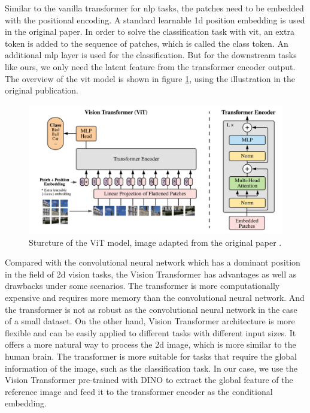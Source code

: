 \documentclass[12pt,DIV14,BCOR12mm,a4paper,footinclude=false,headinclude,parskip=half-,twoside,openright,cleardoublepage=empty,toc=index,bibliography=totoc,listof=totoc]{scrreprt}
\numberwithin{equation}{chapter}
\begin{document}
Similar to the vanilla transformer for \gls{nlp} tasks, the patches need to be embedded with the positional encoding. A standard learnable \gls{1d} position embedding is used in the original paper. In order to solve the classification task with \gls{vit}, an extra token is added to the sequence of patches, which is called the class token. An additional \gls{mlp} layer is used for the classification. But for the downstream tasks like ours, we only need the latent feature from the transformer encoder output. The overview of the \gls{vit} model is shown in figure \ref{img:vit}, using the illustration in the original publication.
\begin{figure}[h]
	\centering
	\includegraphics[width=1.0\textwidth]{img/vit.png}
	\caption{Sturcture of the ViT model, image adapted from the original paper \cite{dosovitskiy2021image}.}
	\label{img:vit}
\end{figure}

Compared with the convolutional neural network which has a dominant position in the field of \gls{2d} vision tasks, the Vision Transformer has advantages as well as drawbacks under some scenarios. The transformer is more computationally expensive and requires more memory than the convolutional neural network. And the transformer is not as robust as the convolutional neural network in the case of a small dataset. On the other hand, Vision Transformer architecture is more flexible and can be easily applied to different tasks with different input sizes. It offers a more natural way to process the \gls{2d} image, which is more similar to the human brain. The transformer is more suitable for tasks that require the global information of the image, such as the classification task. In our case, we use the Vision Transformer pre-trained with DINO to extract the global feature of the reference image and feed it to the transformer encoder as the conditional embedding.
\end{document}

